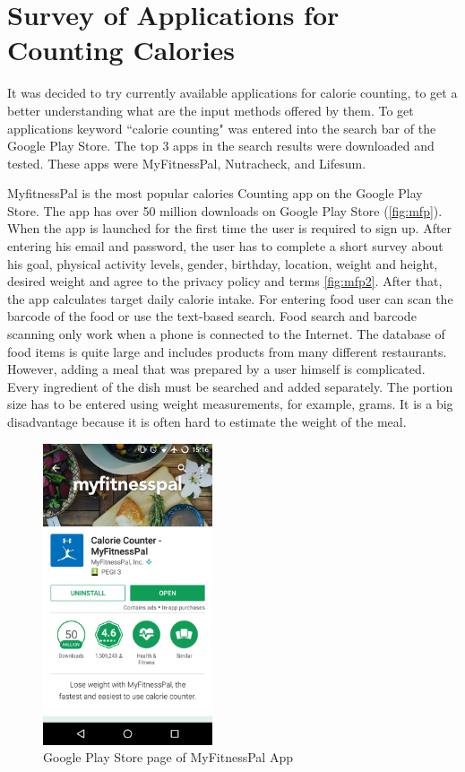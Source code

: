 \section{Survey of Applications for Counting Calories}

 It was decided to try currently available applications for  calorie counting, to get a better understanding what are the input methods offered by them. To get  applications keyword ``calorie counting" was entered into the search bar of the Google Play Store. The top 3 apps in the search results were downloaded and tested. These apps were MyFitnessPal, Nutracheck, and Lifesum.

MyfitnessPal is the most popular calories Counting app on the Google Play Store. The app has over 50 million downloads on Google Play Store (\autoref{fig:mfp}). When the app is launched for the first time the user is required to sign up. After entering his email and password, the user has to complete a short survey about his goal, physical activity levels, gender, birthday, location, weight and height, desired weight and agree to the privacy policy and terms \autoref{fig:mfp2}. After that, the app calculates target daily calorie intake. For entering food user can scan the barcode of the food or use the text-based search. Food search and barcode scanning only work when a phone is connected to the Internet.  The database of food items is quite large and includes products from many different restaurants. However,  adding a meal that was prepared by a user himself is complicated. Every ingredient of the dish must be searched and added separately.  The portion size has to be entered using weight measurements, for example,  grams. It is a big disadvantage because  it is often hard to estimate the weight of the meal.
 
\begin{figure}[ht]
\centering
\includegraphics[width=5cm,scale=0.5]{Figures/2/mfp1.png}
\caption{Google Play Store page of MyFitnessPal App}
\label{fig:mfp}
\end{figure}

